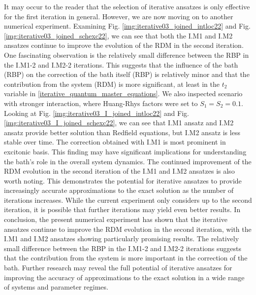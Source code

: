 It may occur to the reader that the selection of iterative ansatzes is only effective for the first iteration in general. However, we are now moving on to another numerical experiment. Examining Fig. \ref{img:iterative03_joined_intloc22} and Fig. \ref{img:iterative03_joined_schexc22}, we can see that both the I.M1 and I.M2 ansatzes continue to improve the evolution of the RDM in the second iteration. One fascinating observation is the relatively small difference between the RBP in the I.M1-2 and I.M2-2 iterations. This suggests that the influence of the bath (RBP) on the correction of the bath itself (RBP) is relatively minor and that the contribution from the system (RDM) is more significant, at least in the $t_2$ variable in \ref{iterative_quantum_master_equations}. We also inspected scenario with stronger interaction, where Huang-Rhys factors were set to $S_1=S_2=0.1$. Looking at Fig. \ref{img:iterative03_I_joined_intloc22} and Fig. \ref{img:iterative03_I_joined_schexc22}, we can see that I.M1 ansatz and I.M2 ansatz provide better solution than Redfield equations, but I.M2 ansatz is less stable over time. The correction obtained with I.M1 is most prominent in excitonic basis. This finding may have significant implications for understanding the bath's role in the overall system dynamics. The continued improvement of the RDM evolution in the second iteration of the I.M1 and I.M2 ansatzes is also worth noting. This demonstrates the potential for iterative ansatzes to provide increasingly accurate approximations to the exact solution as the number of iterations increases. While the current experiment only considers up to the second iteration, it is possible that further iterations may yield even better results. In conclusion, the present numerical experiment has shown that the iterative ansatzes continue to improve the RDM evolution in the second iteration, with the I.M1 and I.M2 ansatzes showing particularly promising results. The relatively small difference between the RBP in the I.M1-2 and I.M2-2 iterations suggests that the contribution from the system is more important in the correction of the bath. Further research may reveal the full potential of iterative ansatzes for improving the accuracy of approximations to the exact solution in a wide range of systems and parameter regimes. \\

